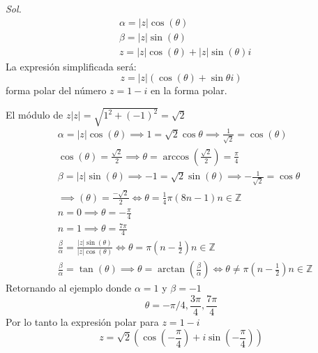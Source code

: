 \textit{ Sol. }
\begin{align*}
    &\alpha = \left\lvert z \right\rvert \cos{(\theta)}\\
    &\beta = \left\lvert z \right\rvert \sin{(\theta)} \\
    &z = \left\lvert z \right\rvert \cos{(\theta)}+\left\lvert z\right\rvert \sin{(\theta)}i
\end{align*}
La expresión simplificada será:
\begin{equation}
    z =\left\lvert z\right\rvert \left(\cos{(\theta)} + \sin{\theta}i\right) 
\end{equation}
forma polar del número $z=1-i$ en la forma polar.

El módulo de $z\left\lvert z\right\rvert = \sqrt{1^2+(-1)^2}=\sqrt{2}$
\begin{align*}
    &\alpha = \left\lvert z \right\rvert \cos{(\theta)} \implies 1 = \sqrt{2}\cos{\theta}\implies \frac{1}{\sqrt{2}} = \cos{(\theta)}  \\
    &\cos{(\theta)} = \frac{\sqrt{2}}{2}\implies \theta = \arccos{\left(\frac{\sqrt{2}}{2} \right)} = \frac{\pi}{4}\\
    &\beta = \left\lvert z\right\rvert \sin{(\theta)}\implies - 1 = \sqrt{2} \sin{(\theta)}\implies - \frac{1}{\sqrt{2}} = \cos{\theta}\\
    &\implies{(\theta)} = \frac{ -\sqrt{2}}{2}\Longleftrightarrow \theta = \frac{1}{4}\pi\left(8n -1\right) n \in \mathbb{Z}\\
    &n = 0\implies \theta = - \frac{\pi}{4}\\
    &n = 1\implies \theta = \frac{7\pi}{4}\\
    &\frac{\beta}{\alpha} = \frac{\left\lvert z\right\rvert \sin{(\theta)} }{\left\lvert z\right\rvert \cos{(\theta)}}\Longleftrightarrow \theta = \pi\left(n - \frac{1}{2}\right)n\in \mathbb{Z}\\
    &\frac{\beta}{\alpha} = \tan{(\theta)}\implies \theta = \arctan{\left(\frac{\beta}{\alpha}\right)}\Longleftrightarrow \theta\neq \pi\left(n - \frac{1}{2}\right)n\in \mathbb{Z}
\end{align*}
Retornando al ejemplo donde $\alpha=1$ y $\beta=-1$
\begin{equation*}
    \theta=- \pi/4, \frac{3\pi}{4}, \frac{7\pi}{4}
\end{equation*}
Por lo tanto la expresión polar para $z=1-i$
\begin{equation*}
    z = \sqrt{2}\left(\cos{\left( - \frac{\pi}{4}\right)} + i\sin{\left( -\frac{\pi}{4}\right)}  \right)
\end{equation*}
